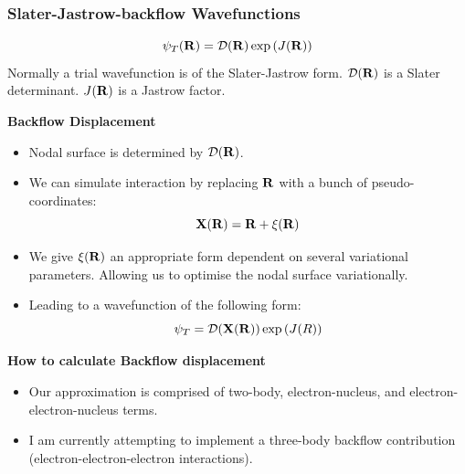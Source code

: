 \documentclass[10pt]{beamer}
\begin{document}
\begin{frame}[allowframebreaks]
    \frametitle{Slater-Jastrow-backflow Wavefunctions}
    \begin{equation}
        \psi_T\pqty{\vb{R}}=\mathcal{D}\pqty{\vb{R}}\exp\pqty{J\pqty{\vb{R}}}
    \end{equation}
    Normally a trial wavefunction is of the Slater-Jastrow form.\newline
    $\mathcal{D}\pqty{\vb{R}}$ is a Slater determinant.\newline
    $J\pqty{\vb{R}}$ is a Jastrow factor.\newline
    \framebreak

    \textbf{Backflow Displacement}
    \begin{itemize}
        \item[\textbullet] Nodal surface is determined by
        $\mathcal{D}\pqty{\vb{R}}$.
        \item[\textbullet] We can simulate interaction by replacing $\vb{R}$
        with a bunch of pseudo-coordinates:
        \begin{equation}
            \vb{X}\pqty{\vb{R}}=\vb{R}+\vb{\xi}\pqty{\vb{R}}
        \end{equation}
        \item[\textbullet] We give $\vb{\xi}\pqty{\vb{R}}$ an appropriate form
        dependent on several variational parameters. Allowing us to optimise the
        nodal surface variationally\cite{LopezRios2006}.
        \item[\textbullet] Leading to a wavefunction of the following form:
        \begin{equation}
            \psi_T=\mathcal{D}\pqty{\vb{X}\pqty{\vb{R}}}\exp\pqty{J\pqty{R}}
        \end{equation}
    \end{itemize}
    \framebreak

    \textbf{How to calculate Backflow displacement}
    \begin{itemize}
        \item[\textbullet] Our approximation is comprised of two-body,
        electron-nucleus, and electron-electron-nucleus terms.
        \item[\textbullet] I am currently attempting to implement a three-body
        backflow contribution (electron-electron-electron interactions).
    \end{itemize}
    \framebreak


\end{frame}
\end{document}
